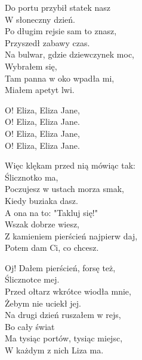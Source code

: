 \begin{text}
   
    Do portu przybił statek nasz\\       
    W słoneczny dzień.\\                 
    Po długim rejsie sam to znasz,\\   
    Przyszedł zabawy czas.\\             
    Na bulwar, gdzie dziewczynek moc,\\ 
    Wybrałem się,\\                     
    Tam panna w oko wpadła mi,\\         
    Miałem apetyt lwi.                

    \vin O! Eliza, Eliza Jane,\\              
    \vin O! Eliza, Eliza Jane.\\              
    \vin O! Eliza, Eliza Jane,\\              
    \vin O! Eliza, Eliza Jane.

    Więc klękam przed nią mówiąc tak:\\
    Ślicznotko ma,\\
    Poczujesz w ustach morza smak,\\
    Kiedy buziaka dasz.\\
    A ona na to: "Takluj się!"\\
    Wszak dobrze wiesz,\\
    Z kamieniem pierścień najpierw daj,\\
    Potem dam Ci, co chcesz.

    Oj! Dałem pierścień, forsę też,\\
    Ślicznotce mej.\\
    Przed ołtarz wkrótce wiodła mnie,\\
    Żebym nie uciekł jej.\\
    Na drugi dzień ruszałem w rejs,\\
    Bo cały świat\\
    Ma tysiąc portów, tysiąc miejsc,\\
    W każdym z nich Liza ma.   

\end{text}
